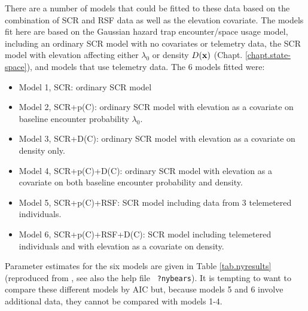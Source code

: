 There are a number of models that could be fitted to these data based on
the combination of SCR and RSF data as well as the elevation covariate.
The models fit here are
 based on the Gaussian hazard trap encounter/space usage model,
including an ordinary SCR model with no covariates or telemetry data,
the SCR model with elevation affecting either $\lambda_{0}$ or density
$D({\bf x})$ (Chapt. \ref{chapt.state-space}), and models that use
telemetry data.  The 6 models fitted were:
\begin{itemize}
\item[] Model 1, SCR: ordinary SCR model

\item[] Model 2, SCR+p(C): ordinary SCR model with elevation as a
  covariate on baseline encounter probability $\lambda_{0}$.

\item[] Model 3, SCR+D(C): ordinary SCR model with elevation as a
  covariate on density only.

\item[] Model 4, SCR+p(C)+D(C): ordinary SCR model with elevation as
  a covariate on both baseline encounter probability and density.

\item[] Model 5, SCR+p(C)+RSF: SCR model including data from 3
  telemetered individuals.

\item[] Model 6, SCR+p(C)+RSF+D(C): SCR model including telemetered
  individuals and with elevation as a covariate on density.
\end{itemize}
Parameter estimates for the six models are
given in Table \ref{tab.nyresults} (reproduced from
\citet{royle_etal:2012mee}, see also the help file \mbox{\tt
  ?nybears}).
It is tempting to want to compare these different models by AIC but,
because models 5 and 6 involve additional data, they cannot be
compared with models 1-4.

